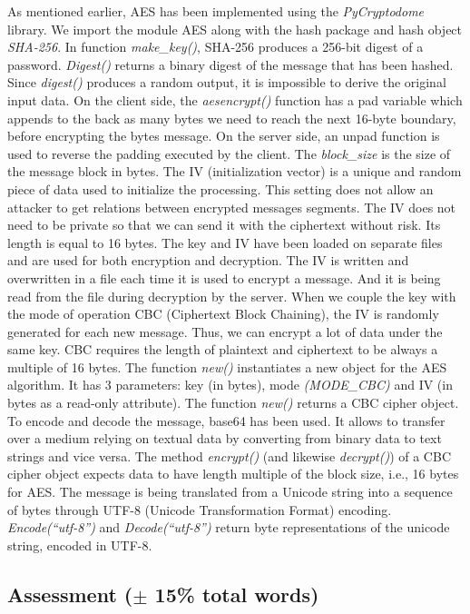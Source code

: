 As mentioned earlier, AES has been implemented using the \textit{PyCryptodome} library. We import the module AES along with the hash package and hash object \textit{SHA-256}. In function \textit{make\_key()}, SHA-256 produces a 256-bit digest of a password. \textit{Digest()} returns a binary digest of the message that has been hashed. Since \textit{digest()} produces a random output, it is impossible to derive the original input data. On the client side, the \textit{aesencrypt()} function has a pad variable which appends to the back as many bytes we need to reach the next 16-byte boundary, before encrypting the bytes message. On the server side, an unpad function is used to reverse the padding executed by the client. The \textit{block\_size} is the size of the message block in bytes. The IV (initialization vector) is a unique and random piece of data used to initialize the processing. This setting does not allow an attacker to get relations between encrypted messages segments. The IV does not need to be private so that we can send it with the ciphertext without risk. Its length is equal to 16 bytes. The key and IV have been loaded on separate files and are used for both encryption and decryption. The IV is written and overwritten in a file each time it is used to encrypt a message. And it is being read from the file during decryption by the server. When we couple the key with the mode of operation CBC (Ciphertext Block Chaining), the IV is randomly generated for each new message. Thus, we can encrypt a lot of data under the same key. CBC requires the length of plaintext and ciphertext to be always a multiple of 16 bytes. The function \textit{new()} instantiates a new object for the AES algorithm. It has 3 parameters: key (in bytes), mode \textit{(MODE\_CBC)} and IV (in bytes as a read-only attribute). The function \textit{new()} returns a CBC cipher object. To encode and decode the message, base64 has been used. It allows to transfer over a medium relying on textual data by converting from binary data to text strings and vice versa. The method \textit{encrypt()} (and likewise \textit{decrypt()}) of a CBC cipher object expects data to have length multiple of the block size, i.e., 16 bytes for AES. The message is being translated from a Unicode string into a sequence of bytes through UTF-8 (Unicode Transformation Format) encoding. \textit{Encode(“utf-8”)} and \textit{Decode(“utf-8”)} return byte representations of the unicode string, encoded in UTF-8.

\subsection{Assessment ($\pm$ 15\% total words)}

